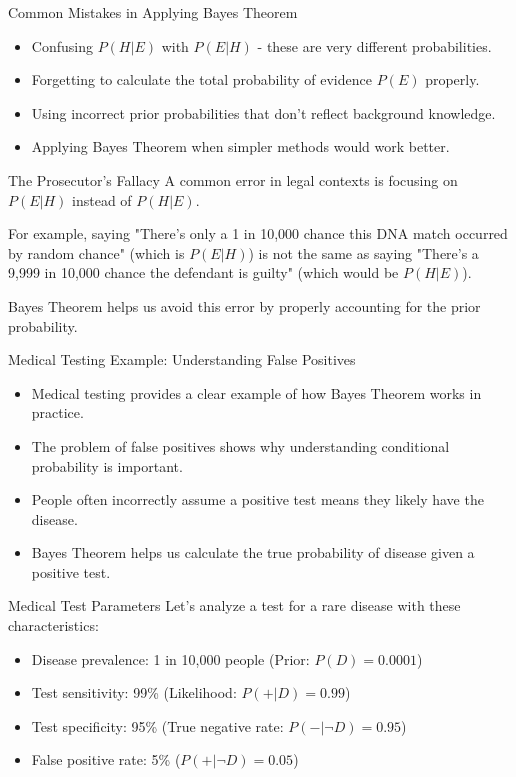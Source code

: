 \documentclass{beamer}
\begin{document}
	\begin{frame}{Common Mistakes in Applying Bayes Theorem}
		\begin{itemize}
			\item Confusing $P(H|E)$ with $P(E|H)$ - these are very different probabilities.
			\item Forgetting to calculate the total probability of evidence $P(E)$ properly.
			\item Using incorrect prior probabilities that don't reflect background knowledge.
			\item Applying Bayes Theorem when simpler methods would work better.
		\end{itemize}
		
		\begin{alertblock}{The Prosecutor's Fallacy}
			A common error in legal contexts is focusing on $P(E|H)$ instead of $P(H|E)$.
			
			For example, saying "There's only a 1 in 10,000 chance this DNA match occurred by random chance" (which is $P(E|H)$) is not the same as saying "There's a 9,999 in 10,000 chance the defendant is guilty" (which would be $P(H|E)$).
			
			Bayes Theorem helps us avoid this error by properly accounting for the prior probability.
		\end{alertblock}
	\end{frame}
	
	\begin{frame}{Medical Testing Example: Understanding False Positives}
		\begin{itemize}
			\item Medical testing provides a clear example of how Bayes Theorem works in practice.
			\item The problem of false positives shows why understanding conditional probability is important.
			\item People often incorrectly assume a positive test means they likely have the disease.
			\item Bayes Theorem helps us calculate the true probability of disease given a positive test.
		\end{itemize}
		
		\begin{block}{Medical Test Parameters}
			Let's analyze a test for a rare disease with these characteristics:
			\begin{itemize}
				\item Disease prevalence: 1 in 10,000 people (Prior: $P(D) = 0.0001$)
				\item Test sensitivity: 99\% (Likelihood: $P(+|D) = 0.99$)
				\item Test specificity: 95\% (True negative rate: $P(-|\neg D) = 0.95$)
				\item False positive rate: 5\% ($P(+|\neg D) = 0.05$)
			\end{itemize}
		\end{block}
	\end{frame}
	
\end{document}
